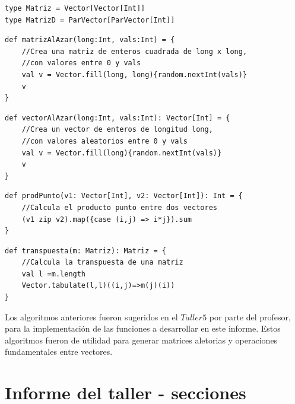 \documentclass[12pt, a4paper]{article}
\begin{document}
\begin{lstlisting}[caption=Definiciones tipos de datos, label=lst:scala_code1]
type Matriz = Vector[Vector[Int]]
type MatrizD = ParVector[ParVector[Int]]
\end{lstlisting}
\begin{lstlisting}[caption=matriz al azar, label=lst:scala_code2]
def matrizAlAzar(long:Int, vals:Int) = {
    //Crea una matriz de enteros cuadrada de long x long,
    //con valores entre 0 y vals
    val v = Vector.fill(long, long){random.nextInt(vals)}
    v
}
\end{lstlisting}
\begin{lstlisting}[caption=vector al azar, label=lst:scala_code3]
def vectorAlAzar(long:Int, vals:Int): Vector[Int] = {
    //Crea un vector de enteros de longitud long,
    //con valores aleatorios entre 0 y vals
    val v = Vector.fill(long){random.nextInt(vals)}
    v
}
\end{lstlisting}
\begin{lstlisting}[caption=producto punto, label=lst:scala_code4]
def prodPunto(v1: Vector[Int], v2: Vector[Int]): Int = {
    //Calcula el producto punto entre dos vectores
    (v1 zip v2).map({case (i,j) => i*j}).sum
}
\end{lstlisting}
\begin{lstlisting}[caption=transpuesta de una matriz, label=lst:scala_code5]
def transpuesta(m: Matriz): Matriz = {
    //Calcula la transpuesta de una matriz
    val l =m.length
    Vector.tabulate(l,l)((i,j)=>m(j)(i))
}
\end{lstlisting}

Los algoritmos anteriores fueron sugeridos en el $Taller 5$ por parte del profesor, para la implementación de las funciones a desarrollar en este informe. Estos algoritmos fueron de utilidad para generar matrices aletorias y operaciones fundamentales entre vectores.

\section{Informe del taller - secciones}
\end{document}
